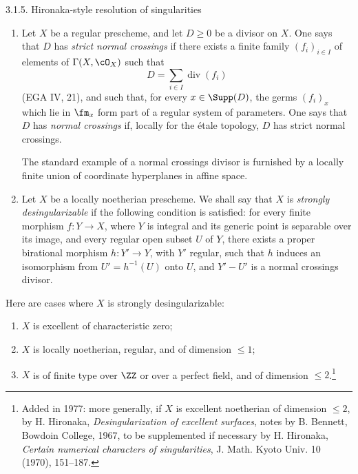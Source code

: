 \begin{statement}{3.1.5. Hironaka-style resolution of singularities}
\begin{enumerate}[label=\alph*)]
\item Let $X$ be a regular prescheme, and let $D\ge0$ be a divisor on $X$. One says that $D$ has \emph{strict normal crossings} if there exists a finite family $(f_i)_{i\in I}$ of elements of $\Gamma(X,\cO_X)$ such that
\[
   D=\sum_{i\in I}\operatorname{div}(f_i)
\]
(EGA IV, 21), and such that, for every $x\in\Supp(D)$, the germs $(f_i)_x$ which lie in $\fm_x$ form part of a regular system of parameters. One says that $D$ has \emph{normal crossings} if, locally for the étale topology, $D$ has strict normal crossings.

The standard example of a normal crossings divisor is furnished by a locally finite union of coordinate hyperplanes in affine space.

\item Let $X$ be a locally noetherian prescheme. We shall say that $X$ is \emph{strongly desingularizable} if the following condition is satisfied: for every finite morphism $f:Y\to X$, where $Y$ is integral and its generic point is separable over its image, and every regular open subset $U$ of $Y$, there exists a proper birational morphism $h:Y'\to Y$, with $Y'$ regular, such that $h$ induces an isomorphism from $U'=h^{-1}(U)$ onto $U$, and $Y'-U'$ is a normal crossings divisor.
\end{enumerate}
Here are cases where $X$ is strongly desingularizable:
\begin{enumerate}[label=\alph*)]
\item $X$ is excellent of characteristic zero;
\item $X$ is locally noetherian, regular, and of dimension $\le1$;
\item $X$ is of finite type over $\ZZ$ or over a perfect field, and of dimension $\le2$.\footnote{Added in 1977: more generally, if $X$ is excellent noetherian of dimension $\le2$, by H. Hironaka, \emph{Desingularization of excellent surfaces}, notes by B. Bennett, Bowdoin College, 1967, to be supplemented if necessary by H. Hironaka, \emph{Certain numerical characters of singularities}, J. Math. Kyoto Univ. 10 (1970), 151--187.}
\end{enumerate}
\end{statement}

